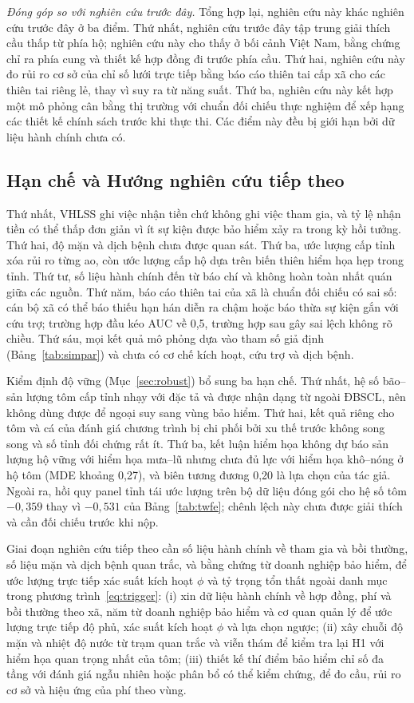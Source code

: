 \documentclass[12pt,a4paper]{article}
\begin{document}
\textit{Đóng góp so với nghiên cứu trước đây.} Tổng hợp lại, nghiên cứu này khác nghiên cứu trước đây ở ba điểm. Thứ nhất, nghiên cứu trước đây tập trung giải thích cầu thấp từ phía hộ; nghiên cứu này cho thấy ở bối cảnh Việt Nam, bằng chứng chỉ ra phía cung và thiết kế hợp đồng đi trước phía cầu. Thứ hai, nghiên cứu này đo rủi ro cơ sở của chỉ số lưới trực tiếp bằng báo cáo thiên tai cấp xã cho các thiên tai riêng lẻ, thay vì suy ra từ năng suất. Thứ ba, nghiên cứu này kết hợp một mô phỏng cân bằng thị trường với chuẩn đối chiếu thực nghiệm để xếp hạng các thiết kế chính sách trước khi thực thi. Các điểm này đều bị giới hạn bởi dữ liệu hành chính chưa có.

\subsection{Hạn chế và Hướng nghiên cứu tiếp theo}

Thứ nhất, VHLSS ghi việc nhận tiền chứ không ghi việc tham gia, và tỷ lệ nhận tiền có thể thấp đơn giản vì ít sự kiện được bảo hiểm xảy ra trong kỳ hồi tưởng. Thứ hai, độ mặn và dịch bệnh chưa được quan sát. Thứ ba, ước lượng cấp tỉnh xóa rủi ro từng ao, còn ước lượng cấp hộ dựa trên biến thiên hiểm họa hẹp trong tỉnh. Thứ tư, số liệu hành chính đến từ báo chí và không hoàn toàn nhất quán giữa các nguồn. Thứ năm, báo cáo thiên tai của xã là chuẩn đối chiếu có sai số: cán bộ xã có thể báo thiếu hạn hán diễn ra chậm hoặc báo thừa sự kiện gắn với cứu trợ; trường hợp đầu kéo AUC về 0,5, trường hợp sau gây sai lệch không rõ chiều. Thứ sáu, mọi kết quả mô phỏng dựa vào tham số giả định (Bảng~\ref{tab:simpar}) và chưa có cơ chế kích hoạt, cứu trợ và dịch bệnh.

Kiểm định độ vững (Mục~\ref{sec:robust}) bổ sung ba hạn chế. Thứ nhất, hệ số bão--sản lượng tôm cấp tỉnh nhạy với đặc tả và được nhận dạng từ ngoài ĐBSCL, nên không dùng được để ngoại suy sang vùng bảo hiểm. Thứ hai, kết quả riêng cho tôm và cá của đánh giá chương trình bị chi phối bởi xu thế trước không song song và số tỉnh đối chứng rất ít. Thứ ba, kết luận hiểm họa không dự báo sản lượng hộ vững với hiểm họa mưa--lũ nhưng chưa đủ lực với hiểm họa khô--nóng ở hộ tôm (MDE khoảng 0,27), và biên tương đương 0,20 là lựa chọn của tác giả. Ngoài ra, hồi quy panel tỉnh tái ước lượng trên bộ dữ liệu đóng gói cho hệ số tôm $-0{,}359$ thay vì $-0{,}531$ của Bảng~\ref{tab:twfe}; chênh lệch này chưa được giải thích và cần đối chiếu trước khi nộp.

Giai đoạn nghiên cứu tiếp theo cần số liệu hành chính về tham gia và bồi thường, số liệu mặn và dịch bệnh quan trắc, và bằng chứng từ doanh nghiệp bảo hiểm, để ước lượng trực tiếp xác suất kích hoạt $\phi$ và tỷ trọng tổn thất ngoài danh mục trong phương trình~\eqref{eq:trigger}: (i) xin dữ liệu hành chính về hợp đồng, phí và bồi thường theo xã, năm từ doanh nghiệp bảo hiểm và cơ quan quản lý để ước lượng trực tiếp độ phủ, xác suất kích hoạt $\phi$ và lựa chọn ngược; (ii) xây chuỗi độ mặn và nhiệt độ nước từ trạm quan trắc và viễn thám để kiểm tra lại H1 với hiểm họa quan trọng nhất của tôm; (iii) thiết kế thí điểm bảo hiểm chỉ số đa tầng với đánh giá ngẫu nhiên hoặc phân bổ có thể kiểm chứng, để đo cầu, rủi ro cơ sở và hiệu ứng của phí theo vùng.
\end{document}
